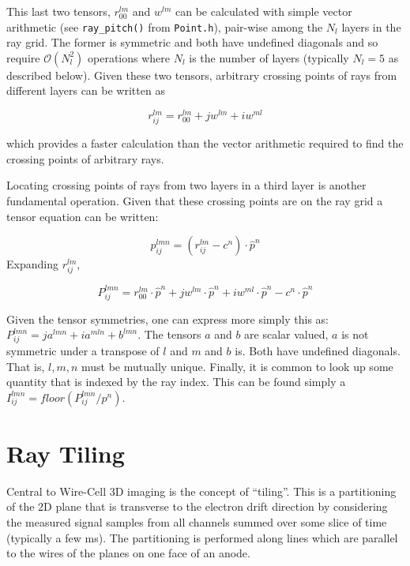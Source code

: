 \documentclass[11pt]{article}
\begin{document}
This last two tensors, \(r^{lm}_{00}\) and \(w^{lm}\) can be calculated with simple vector arithmetic (see \texttt{ray\_pitch()} from \texttt{Point.h}), pair-wise among the \(N_l\) layers in the ray grid.  The former is symmetric and both have undefined diagonals and so require \(\mathcal{O}(N_l^2)\) operations where \(N_l\) is the number of layers (typically \(N_l = 5\) as described below).  Given these two tensors, arbitrary crossing points of rays from different layers can be written as

\begin{equation}
r^{lm}_{ij} = r^{lm}_{00} + j w^{lm} + i w^{ml}
\end{equation}

which provides a faster calculation than the vector arithmetic required to find the crossing points of arbitrary rays.  

Locating crossing points of rays from two layers in a third layer is another fundamental operation.  Given that these crossing points are on the ray grid a tensor equation can be written:

\begin{equation}
p^{lmn}_{ij} = (r^{lm}_{ij} - c^n) \cdot \hat{p}^n
\end{equation}
Expanding \(r^{lm}_{ij}\), 

\begin{equation}
P^{lmn}_{ij} = r^{lm}_{00}\cdot \hat{p}^n + jw^{lm} \cdot \hat{p}^n + iw^{ml} \cdot \hat{p}^n - c^n \cdot \hat{p}^n
\end{equation}

Given the tensor symmetries, one can express more simply this as: \(P^{lmn}_{ij} = ja^{lmn} + ia^{mln} + b^{lmn}\).  The tensors \(a\) and \(b\) are scalar valued, \(a\) is not symmetric under a transpose of \(l\) and \(m\) and \(b\) is.  Both have undefined diagonals.  That is, \(l, m, n\) must be mutually unique.  Finally, it is common to look up some quantity that is indexed by the ray index.  This can be found simply a \(I^{lmn}_{ij} = floor(P^{lmn}_{ij}/p^n)\).

\section{Ray Tiling}
\label{sec:raytiling}

Central to Wire-Cell 3D imaging is the concept of ``tiling''.  This is a partitioning of the 2D plane that is transverse to the electron drift direction by considering the measured signal samples from all channels summed over some slice of time (typically a few ms).  The partitioning is performed along lines which are parallel to the wires of the planes on one face of an anode.
\end{document}

